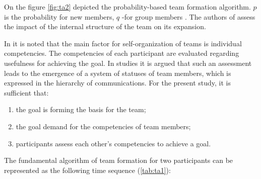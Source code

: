 \documentclass[12pt]{report}
\theoremstyle{definition}
\providecommand{\tightlist}{%
	\setlength{\itemsep}{0pt}\setlength{\parskip}{0pt}}
\begin{document}
On the figure \ref{fig:ta2} depicted the probability-based team formation algorithm. $p$ is the probability for new members, $q$ -for group members \cite{guimera2005team}.
The authors of \cite{guimera2005team} assess the impact of the internal structure of the team on its expansion.

In \cite{moe2009overcoming} it is noted that the main factor for self-organization of teams is individual competencies.
The competencies of each participant are evaluated regarding usefulness for achieving the goal. 
In studies \cite{berger1972status, berger1980status} it is argued that such an assessment leads to the emergence of a system of statuses of team members, which is expressed in the hierarchy of communications. 
For the present study, it is sufficient that:
\begin{enumerate}
	\tightlist
	\item the goal is forming the basis for the team;
	\item the goal demand for the competencies of team members;
	\item participants assess each other's competencies to achieve a goal.
\end{enumerate}

The fundamental algorithm of team formation for two participants can be represented as the following time sequence (\ref{tab:ta1}):
\end{document}
